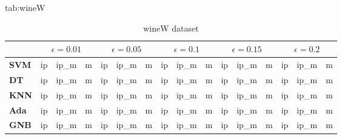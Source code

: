 \begin{table}[htbp]
\scriptsize
\floatconts
  {tab:wineW}%
  {\caption{wineW dataset}}%
  {
\begin{tabular}{cl|lll|lll|lll|lll|lll}
             && \multicolumn{3}{c|}{$\epsilon=0.01$} & \multicolumn{3}{c|}{$\epsilon=0.05$} & \multicolumn{3}{c|}{$\epsilon=0.1$} & \multicolumn{3}{c|}{$\epsilon=0.15$} & \multicolumn{3}{c}{$\epsilon=0.2$} \\
\hline
\hline
\hline

\hline
\multicolumn{2}{l|}{\textbf{SVM}} & ip         & ip\_m      & m          & ip         & ip\_m      & m          & ip         & ip\_m      & m          & ip         & ip\_m      & m          & ip         & ip\_m      & m           \\
\hline

\hline
\hline
\hline

\hline
\multicolumn{2}{l|}{\textbf{DT}}  & ip         & ip\_m      & m          & ip         & ip\_m      & m          & ip         & ip\_m      & m          & ip         & ip\_m      & m          & ip         & ip\_m      & m           \\
\hline

\hline
\hline
\hline

\hline
\multicolumn{2}{l|}{\textbf{KNN}} & ip         & ip\_m      & m          & ip         & ip\_m      & m          & ip         & ip\_m      & m          & ip         & ip\_m      & m          & ip         & ip\_m      & m           \\
\hline

\hline
\hline
\hline

\hline
\multicolumn{2}{l|}{\textbf{Ada}} & ip         & ip\_m      & m          & ip         & ip\_m      & m          & ip         & ip\_m      & m          & ip         & ip\_m      & m          & ip         & ip\_m      & m           \\
\hline

\hline
\hline
\hline

\hline
\multicolumn{2}{l|}{\textbf{GNB}} & ip         & ip\_m      & m          & ip         & ip\_m      & m          & ip         & ip\_m      & m          & ip         & ip\_m      & m          & ip         & ip\_m      & m           \\
\hline

\hline
\hline
\hline


\end{tabular}}
\end{table}

